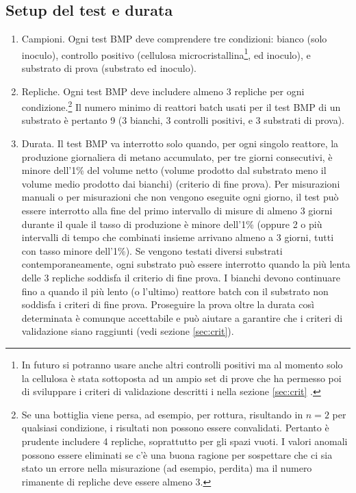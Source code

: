 \documentclass[]{article}
\begin{document}
\subsection{Setup del test e durata}
\label{sec:setup}
\begin{enumerate}
  \item Campioni. 
    Ogni test BMP deve comprendere tre condizioni: bianco (solo inoculo), controllo positivo (cellulosa microcristallina\footnote{
      In futuro si potranno usare anche altri controlli positivi \citep{kochEvaluationCommonSupermarket2020} ma al momento solo la cellulosa è stata sottoposta ad un ampio set di prove che ha permesso poi di sviluppare i criteri di validazione descritti i nella sezione \ref{sec:crit} \citep{hafnerImprovingInterlaboratoryReproducibility2020}.
    }, ed inoculo), e substrato di prova (substrato ed inoculo).
  \item Repliche. 
    Ogni test BMP deve includere almeno 3 repliche per ogni condizione.\footnote{
      Se una bottiglia viene persa, ad esempio, per rottura, risultando in $n=2$ per qualsiasi condizione, i risultati non possono essere convalidati.
      Pertanto è prudente includere 4 repliche, soprattutto per gli spazi vuoti.
      I valori anomali possono essere eliminati se c'è una buona ragione per sospettare che ci sia stato un errore nella misurazione (ad esempio, perdita) ma il numero rimanente di repliche deve essere almeno 3. 
    }
    Il numero minimo di reattori batch usati per il test BMP di un substrato è pertanto 9 (3 bianchi, 3 controlli positivi, e 3 substrati di prova).
  \item Durata. 
    Il test BMP va interrotto solo quando, per ogni singolo reattore, la produzione giornaliera di metano accumulato, per tre giorni consecutivi, è minore dell’1\% del volume netto (volume prodotto dal substrato meno il volume medio prodotto dai bianchi) (criterio di fine prova). 
    Per misurazioni manuali o per misurazioni che non vengono eseguite ogni giorno, il test può essere interrotto alla fine del primo intervallo di misure di almeno 3 giorni durante il quale il tasso di produzione è minore dell’1\% (oppure 2 o più intervalli di tempo che combinati insieme arrivano almeno a 3 giorni, tutti con tasso minore dell’1\%). 
    Se vengono testati diversi substrati contemporaneamente, ogni substrato può essere interrotto quando la più lenta delle 3 repliche soddisfa il criterio di fine prova. 
    I bianchi devono continuare fino a quando il più lento (o l’ultimo) reattore batch con il substrato non soddisfa i criteri di fine prova. 
    Proseguire la prova oltre la durata così determinata è comunque accettabile e può aiutare a garantire che i criteri di validazione siano raggiunti (vedi sezione \ref{sec:crit}).
\end{enumerate}
\end{document}
